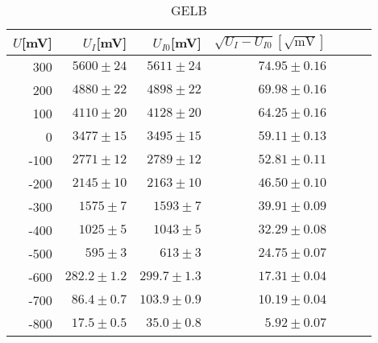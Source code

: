 \begin{table}[h!]
  \centering
  \caption{GELB}
    \begin{tabular}{r r r r r r r}
    \toprule
    $U$[mV] & $U_I$[mV] & $U_{I0}$[mV] & $\sqrt{U_I  - U_{I0}}[\sqrt{\text{mV}}]$\\
    \midrule
    300   & $5600 \pm 24$ & $5611  \pm24$ & $74.95 \pm 0.16$ \\
    200   &$ 4880 \pm 22 $&$ 4898\pm 22$ & $69.98 \pm 0.16$ \\
    100   & $4110 \pm 20$ & $4128 \pm 20$& $64.25 \pm 0.16$\\
    0     & $3477 \pm 15$ & $3495 \pm 15$ & $59.11 \pm 0.13$ \\
    -100  & $2771 \pm 12 $& $2789 \pm 12$ & $52.81 \pm 0.11$ \\
    -200  & $2145 \pm 10$ &$ 2163 \pm 10$ & $46.50 \pm0.10 $\\
    -300  & $1575 \pm 7$& $1593\pm 7 $& $39.91 \pm 0.09$\\
    -400  & $1025 \pm 5$ & $1043 \pm 5 $& $32.29 \pm 0.08$ \\
    -500  & $595 \pm 3$ & $613 \pm 3$ & $24.75 \pm 0.07 $\\
    -600  & $282.2 \pm 1.2$ & $299.7 \pm 1.3$ &$ 17.31 \pm 0.04$ \\
    -700  & $86.4 \pm 0.7$ & $103.9 \pm 0.9$ & $10.19 \pm 0.04$ \\
    -800  & $17.5  \pm 0.5$ & $35.0  \pm 0.8 $& $5.92 \pm 0.07$ \\
    \end{tabular}%
  \label{tab:addlabel}%
\end{table}%

